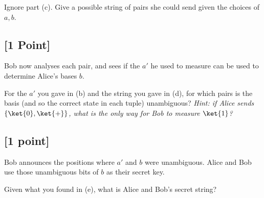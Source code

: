 \documentclass[11pt]{article}
\begin{document}
Ignore part (c). Give a possible string of pairs she could send given the choices of $a,b$.


\subsection{[1 Point]} 
Bob now analyses each pair, and sees if the $a'$ he used to measure can be used to determine Alice's bases $b$. 

For the $a'$ you gave in (b) and the string you gave in (d), for which pairs is the basis (and so the correct state in each tuple) unambiguous?
\textit{Hint: if Alice sends $\{\ket{0}, \ket{+}\}$, what is the only way for Bob to measure $\ket{1}$?}


\subsection{[1 point]}
Bob announces the positions where $a'$ and $b$ were unambiguous. Alice and Bob use those unambiguous bits of $b$ as their secret key.

Given what you found in (e), what is Alice and Bob's secret string?
\end{document}
